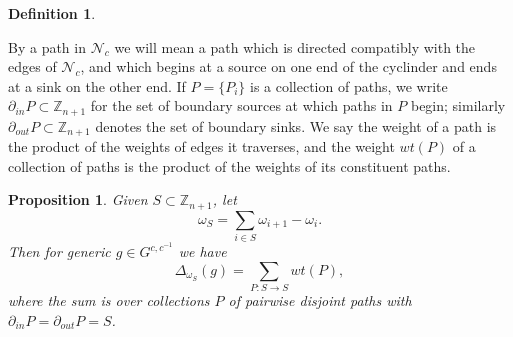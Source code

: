 \documentclass[12pt]{amsart}
\newcommand{\ZZ}{\mathbb{Z}}
\newcommand{\cN}{\mathcal{N}} %
\newtheorem{definition}[theorem]{Definition}
\newtheorem{proposition}[theorem]{Proposition}
\theoremstyle{remark}
\numberwithin{equation}{section}
\begin{document}
\begin{definition}
\begin{center}
\end{center}
\end{definition}

By a path in $\cN_c$ we will mean a path which is directed compatibly with the edges of $\cN_c$, and which begins at a source on one end of the cyclinder and ends at a sink on the other end. 
If $P = \{P_i\}$ is a collection of paths, we write $\partial_{in}P \subset \ZZ_{n+1}$ for the set of boundary sources at which paths in $P$ begin; similarly $\partial_{out}P \subset \ZZ_{n+1}$ denotes the set of boundary sinks. 
We say the weight of a path is the product of the weights of edges it traverses, and the weight $wt(P)$ of a collection of paths is the product of the weights of its constituent paths.

\begin{proposition}\label{prop:minorsfrompaths}
Given $S \subset \ZZ_{n+1}$, let
\[ \omega_S = \sum_{i \in S} \omega_{i+1} - \omega_i.\] 
Then for generic $g\in G^{c,c^{-1}}$ we have \[ \Delta_{\omega_S}(g) = \sum_{P: S \to S} wt(P), \]
where the sum is over collections $P$ of pairwise disjoint paths with $\partial_{in}P = \partial_{out}P = S$.
\end{proposition}
\end{document}
